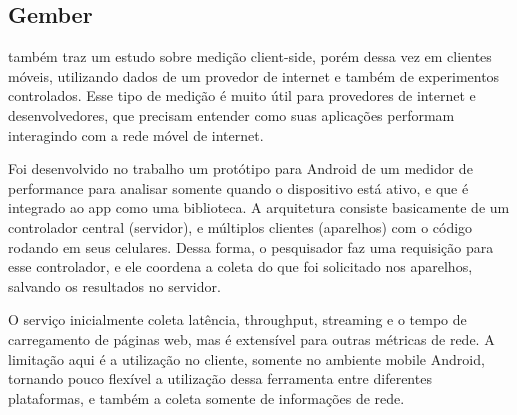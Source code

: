 \documentclass[12pt]{tcc}
\begin{document}
		\subsection{Gember}
		\par \citep{Gember2012Obtaining} também traz um estudo sobre medição client-side, porém dessa vez em clientes móveis, utilizando dados de um provedor de internet e também de experimentos controlados. Esse tipo de medição é muito útil para provedores de internet e desenvolvedores, que precisam entender como suas aplicações performam interagindo com a rede móvel de internet.
		\par Foi desenvolvido no trabalho um protótipo para Android de um medidor de performance para analisar somente quando o dispositivo está ativo, e que é integrado ao app como uma biblioteca. A arquitetura consiste basicamente de um controlador central (servidor), e múltiplos clientes (aparelhos) com o código rodando em seus celulares. Dessa forma, o pesquisador faz uma requisição para esse controlador, e ele coordena a coleta do que foi solicitado nos aparelhos, salvando os resultados no servidor.
		\par O serviço inicialmente coleta latência, throughput, streaming e o tempo de carregamento de páginas web, mas é extensível para outras métricas de rede. A limitação aqui é a utilização no cliente, somente no ambiente mobile Android, tornando pouco flexível a utilização dessa ferramenta entre diferentes plataformas, e também a coleta somente de informações de rede.
\end{document}
